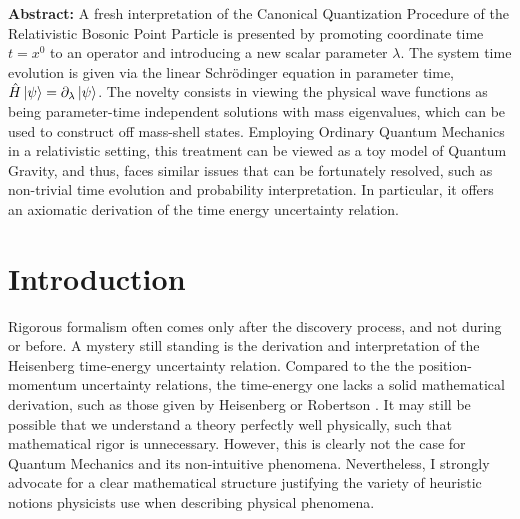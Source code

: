 \documentclass[twoside,a4paper,11pt]{article}
\numberwithin{equation}{section}
\begin{document}
\vspace*{\fill}
\begin{center}
\textbf{\large Abstract:}
\justify
A fresh interpretation of the Canonical Quantization Procedure of the Relativistic Bosonic Point Particle is presented by promoting coordinate time $t = x^0$ to an operator and introducing a new scalar parameter $\lambda$. The system time evolution is given via the linear  Schr{\"o}dinger equation in parameter time, $\hat{H} \ket{\psi} = \partial_\lambda \ket{\psi}$. The novelty consists in viewing the physical wave functions as being parameter-time independent solutions with mass eigenvalues, which can be used to construct off mass-shell states. Employing Ordinary Quantum Mechanics in a relativistic setting, this treatment can be viewed as a toy model of Quantum Gravity, and thus, faces similar issues that can be fortunately resolved, such as non-trivial time evolution and probability interpretation. In particular, it offers an axiomatic derivation of the time energy uncertainty relation.
\end{center}
\vspace*{\fill}

\newpage

\setcounter{tocdepth}{3}
\tableofcontents

\newpage
\justify

\setcounter{page}{1}


\section{Introduction}

Rigorous formalism often comes only after the discovery process, and not during or before. A mystery still standing is the derivation and interpretation of the Heisenberg time-energy uncertainty relation. Compared to the the position-momentum uncertainty relations, the time-energy one lacks a solid mathematical derivation, such as those given by Heisenberg \cite{HeisenbergUR}  or Robertson \cite{RobertsonUR}. It may still be possible that we understand a theory perfectly well physically, such that mathematical rigor is unnecessary. However, this is clearly not the case for Quantum Mechanics and its non-intuitive phenomena. Nevertheless, I strongly advocate for a clear mathematical structure justifying the variety of heuristic notions physicists use when describing physical phenomena.
\end{document}
